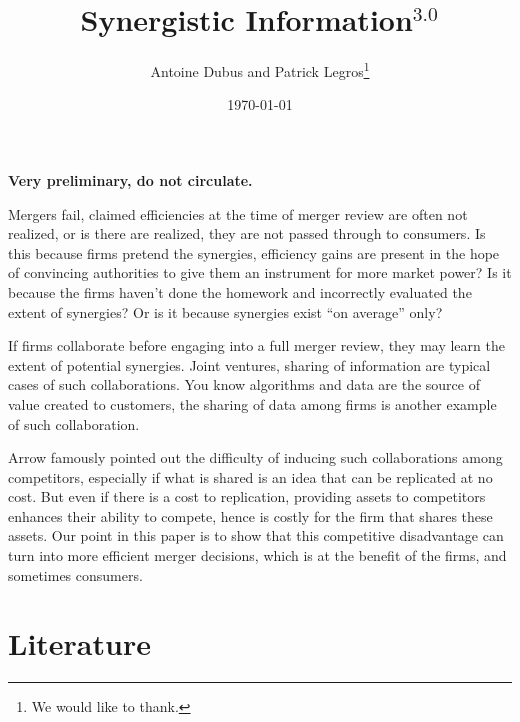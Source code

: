 \documentclass[a4paper,leqno]{article}%
\begin{document}
\title{Synergistic Information$^{3.0}$}

\author{Antoine Dubus and Patrick Legros\thanks{We would like to thank.}}

\date{\today}




\maketitle

\textbf{Very preliminary, do not circulate.}


\baselineskip0.7cm

Mergers fail, claimed efficiencies at the time of merger review are often not realized, or is there are realized, they are not passed through to consumers. Is this because firms pretend the synergies, efficiency gains are present in the hope of convincing authorities to give them an instrument for more market power? Is it because the firms haven't done the homework and incorrectly evaluated the extent of synergies? Or is it because synergies exist ``on average'' only?



If firms collaborate before engaging into a full merger review, they may learn the extent of potential synergies. Joint ventures, sharing of information are typical cases of such collaborations. You know algorithms and data are the source of value created to customers, the sharing of data among firms is another example of such collaboration.



Arrow famously pointed out the difficulty of inducing such collaborations among competitors, especially if what is shared is an idea that can be replicated at no cost. But even if there is a cost to replication, providing assets to competitors enhances their ability to compete, hence is costly for the firm that shares these assets. Our point in this paper is to show that this competitive disadvantage can turn into more efficient merger decisions, which is at the benefit of the firms, and sometimes consumers.







\section{Literature}
\end{document}

